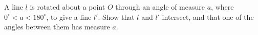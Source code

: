 A line $l$ is rotated about a point $O$ through an angle of measure $a$, where $0^\circ<a<180^\circ$, to give a line $l'$. Show that $l$ and $l'$ intersect, and that one of the angles between them has measure $a$.
